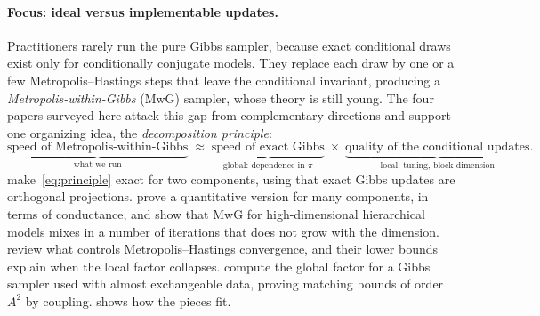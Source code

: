 \documentclass[11pt]{article}
\theoremstyle{remark}
\newcommand{\QJ}{\textsc{qj}}
\newcommand{\ARZ}{\textsc{arz}}
\newcommand{\GO}{\textsc{go}}
\newcommand{\BJ}{\textsc{bj}}
\begin{document}
\paragraph{Focus: ideal versus implementable updates.} Practitioners rarely run the pure Gibbs sampler, because exact conditional draws exist only for conditionally conjugate models. They replace each draw by one or a few Metropolis--Hastings steps that leave the conditional invariant, producing a \emph{Metropolis-within-Gibbs} (MwG) sampler, whose theory is still young. The four papers surveyed here attack this gap from complementary directions and support one organizing idea, the \emph{decomposition principle}:
\begin{equation}\label{eq:principle}
\underbrace{\text{speed of Metropolis-within-Gibbs}}_{\text{what we run}}\;\approx\;\underbrace{\text{speed of exact Gibbs}}_{\text{global: dependence in }\pi}\;\times\;\underbrace{\text{quality of the conditional updates}}_{\text{local: tuning, block dimension}}.
\end{equation}
\citet[henceforth \QJ]{qin2022convergence} make~\eqref{eq:principle} exact for two components, using that exact Gibbs updates are orthogonal projections. \citet[\ARZ]{ascolani2026scalability} prove a quantitative version for many components, in terms of conductance, and show that MwG for high-dimensional hierarchical models mixes in a number of iterations that does not grow with the dimension. \citet[\BJ]{brown2024convergence} review what controls Metropolis--Hastings convergence, and their lower bounds \citep{brown2024lower} explain when the local factor collapses. \citet[\GO]{gerencser2023rates} compute the global factor for a Gibbs sampler used with almost exchangeable data, proving matching bounds of order $A^2$ by coupling.  shows how the pieces fit.
\end{document}
